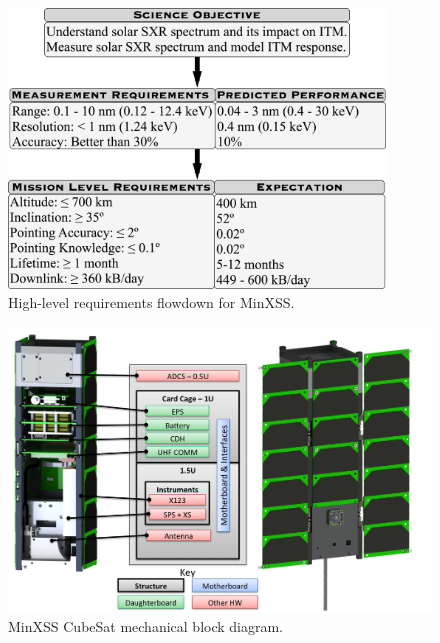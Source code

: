 \begin{figure}[!h]
    \begin{center}
	    \includegraphics[width=100mm]{Images/MinxssRequirmentsFlowdown.png}
    \end{center}
    \caption[MinXSS requirements flowdown]{
        High-level requirements flowdown for MinXSS. 
    }
    \label{fig:minxssrequirementsflowdown}
\end{figure}

\begin{figure}[!h]
    \begin{center}
	    \includegraphics[width=\textwidth]{Images/MinxssMechanicalBlockDiagram.png}
    \end{center}
    \caption[MinXSS mechanical block diagram]{
        MinXSS CubeSat mechanical block diagram. 
    }
    \label{fig:mehanicalblockdiagram}
\end{figure}

